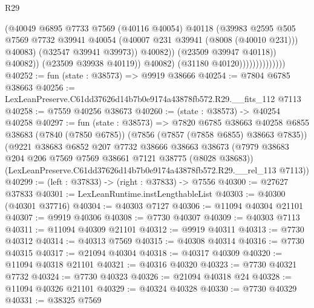 \begin{lexlean}{R29}
\begin{coremodule}
                                            (@40049
                                              @6895
                                              @7733
                                              @7569
                                              (@40116 @40054)
                                              @40118
                                              (@39983
                                                @2595
                                                @505
                                                @7569
                                                @7732
                                                @39941
                                                @40054
                                                (@40007 @231 @39941 (@8008 (@40010 @231)))
                                                @40083)
                                              (@32547 @39941 @39973))
                                            @40082))
                                        (@23509 @39947 @40118))
                                      @40082))
                                  (@23509 @39938 @40119))
                                @40082)
                              (@31180 @40120))))))))))))))
@40252 := fun (state : @38573) => @9919 @38666
@40254 := @7804 @6785 @38663
@40256 := LexLeanPreserve.C61dd37626d14b7b0e9174a43878fb572.R29.__fits_112 @7113
@40258 := @7559 @40256 @38673
@40260 := (state : @38573) -> @40254 @40258
@40297 := fun (state : @38573) =>
  @7820
    @6785
    @38663
    @40258
    @6855
    @38683
    (@7840 (@7850 @6785))
    (@7856 (@7857 (@7858 @6855) @38663 @7835))
    (@9221
      @38683
      @6852
      @207
      @7732
      @38666
      @38663
      @38673
      (@7979 @38683 @204 @206 @7569 @7569 @38661 @7121 @38775 (@8028 @38683))
      (LexLeanPreserve.C61dd37626d14b7b0e9174a43878fb572.R29.__rel_113 @7113))
@40299 := (left : @37833) -> (right : @37833) -> @7556
@40300 := @27627 @37833
@40301 := LexLeanRuntime.instLengthableList
@40303 := @40300 (@40301 @37716)
@40304 := @40303 @7127
@40306 := @11094 @40304 @21101
@40307 := @9919 @40306
@40308 := @7730 @40307
@40309 := @40303 @7113
@40311 := @11094 @40309 @21101
@40312 := @9919 @40311
@40313 := @7730 @40312
@40314 := @40313 @7569
@40315 := @40308 @40314
@40316 := @7730 @40315
@40317 := @21094 @40304
@40318 := @40317 @40309
@40320 := @11094 @40318 @21101
@40321 := @40316 @40320
@40323 := @7730 @40321 @7732
@40324 := @7730 @40323
@40326 := @21094 @40318 @24
@40328 := @11094 @40326 @21101
@40329 := @40324 @40328
@40330 := @7730 @40329
@40331 := @38325 @7569

\end{coremodule}
\end{lexlean}
